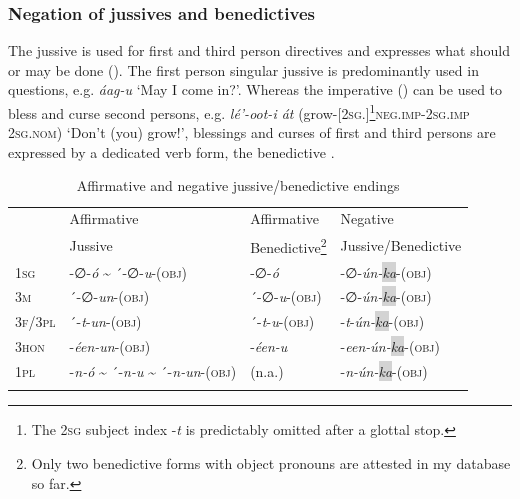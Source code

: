 \documentclass[output=paper,colorlinks,citecolor=brown,draftmode
]{langscibook}
\begin{document}
\newpage%
\subsubsection{Negation of jussives and benedictives}\label{sec:treis:2.2.2}
The jussive is used for first and third person directives and expresses what should or may be done (). The first person singular jussive is predominantly used in questions, e.g. \textit{áag-u} ‘May I come in?’. Whereas the imperative () can be used to bless and curse second persons, e.g. \textit{lé’-oot-i át} (grow-[\textsc{2sg.}]\footnote{The \textsc{2sg} subject index -\textit{t} is predictably omitted after a glottal stop.}\textsc{neg.imp}-\textsc{2sg.imp} \textsc{2sg.nom}) ‘Don’t (you) grow!’, blessings and curses of first and third persons are expressed by a dedicated verb form, the benedictive .

\begin{table}
\caption{Affirmative and negative jussive/benedictive endings}
\label{tab:treis:7}
 \begin{tabularx}{\textwidth}{llXl}
  \lsptoprule
& Affirmative & Affirmative & Negative \\
& Jussive & Benedictive\footnote{Only two benedictive forms with object pronouns are attested in my database so far.} & Jussive/Benedictive \\ 
    \midrule 
\textsc{1sg} & -∅-\textit{ó} \~{} ´-∅-\textit{u}-(\textsc{obj}) & -∅-\textit{ó}	& -∅-\textit{ún-\colorbox{lightgray}{ka}}-(\textsc{obj}) \\
\textsc{3m} & ´-∅-\textit{un}-(\textsc{obj}) & ´-∅-\textit{u}-(\textsc{obj}) 	& -∅-\textit{ún-\colorbox{lightgray}{ka}}-(\textsc{obj}) \\
\textsc{3f/3pl} & ´-\textit{t}-\textit{un}-(\textsc{obj}) & ´-\textit{t}-\textit{u}-(\textsc{obj}) 	& -\textit{t}-\textit{ún-\colorbox{lightgray}{ka}}-(\textsc{obj}) \\
\textsc{3hon} & -\textit{éen-un}-(\textsc{obj}) & -\textit{éen-u}	& -\textit{een-ún-\colorbox{lightgray}{ka}}-(\textsc{obj})  \\
\textsc{1pl} & -\textit{n-ó} \~{} ´-\textit{n-u} \~{} ´-\textit{n-un}-(\textsc{obj}) & (n.a.) & -\textit{n-ún-\colorbox{lightgray}{ka}}-(\textsc{obj})\\
  \lspbottomrule
 \end{tabularx}
\end{table}
\end{document}
